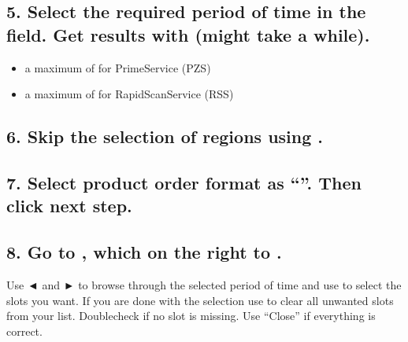 \documentclass[letterpaper,10pt,english]{sphinxmanual}
\begin{document}
\subsection{5. Select the required period of time in the  field. Get results with  (might take a while).}
\label{\detokenize{ordering_data:select-the-required-period-of-time-in-the-select-date-time-field-get-results-with-apply-might-take-a-while}}
\begin{itemize}
\item {} 
a maximum of  for Prime\sphinxhyphen{}Service (PZS)

\item {} 
a maximum of  for Rapid\sphinxhyphen{}Scan\sphinxhyphen{}Service (RSS)

\end{itemize}


\subsection{6. Skip the selection of regions using .}
\label{\detokenize{ordering_data:skip-the-selection-of-regions-using-next-step}}


\subsection{7. Select product order format as “”. Then click next step.}
\label{\detokenize{ordering_data:select-product-order-format-as-hrit-data-sets-in-tar-file-then-click-next-step}}


\subsection{8. Go to , which on the right to .}
\label{\detokenize{ordering_data:go-to-details-which-on-the-right-to-next-step}}

Use ◄ and ► to browse through the selected period of time and use  to select the slots you want. If you are done with
the selection use  to clear all unwanted slots from your list. Double\sphinxhyphen{}check if no slot is missing. Use “Close” if everything
is correct.
\end{document}
